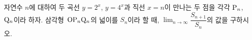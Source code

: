 자연수 $n$에 대하여 두 곡선 $y=2^x$, $y=4^x$과 직선 $x=n$이 만나는 두 점을 각각 $\mathrm{P}_n$, $\mathrm{Q}_n$이라 하자. 삼각형~$\mathrm{OP}_n\mathrm{Q}_n$의 넓이를 $S_n$이라 할 때, $\displaystyle\lim_{n\to\infty}\dfrac{S_{n+1}}{S_n}$의 값을 구하시오. 
